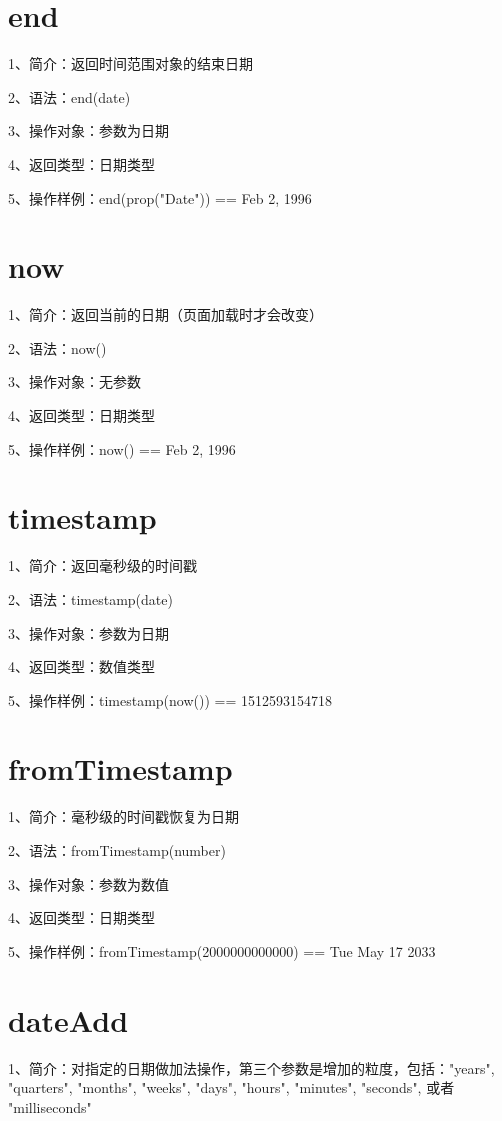 \section{end}

1、简介：返回时间范围对象的结束日期

2、语法：end(date)

3、操作对象：参数为日期

4、返回类型：日期类型

5、操作样例：end(prop("Date")) == Feb 2, 1996

\section{now}

1、简介：返回当前的日期（页面加载时才会改变）

2、语法：now()

3、操作对象：无参数

4、返回类型：日期类型

5、操作样例：now() == Feb 2, 1996

\section{timestamp}

1、简介：返回毫秒级的时间戳

2、语法：timestamp(date)

3、操作对象：参数为日期

4、返回类型：数值类型

5、操作样例：timestamp(now()) == 1512593154718

\section{fromTimestamp}

1、简介：毫秒级的时间戳恢复为日期

2、语法：fromTimestamp(number)

3、操作对象：参数为数值

4、返回类型：日期类型

5、操作样例：fromTimestamp(2000000000000) == Tue May 17 2033

\section{dateAdd}

1、简介：对指定的日期做加法操作，第三个参数是增加的粒度，包括："years", "quarters", "months", "weeks", "days", "hours", "minutes", "seconds", 或者 "milliseconds"

